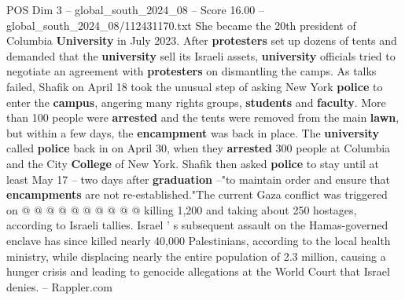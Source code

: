 \begin{textsample}{POS Dim 3 – global\_south\_2024\_08 – Score 16.00 – global\_south\_2024\_08/112431170.txt}
She became the 20th president of Columbia \textbf{University} in July 2023.
After \textbf{protesters} set up dozens of tents and demanded that the \textbf{university} sell its Israeli assets, \textbf{university} officials tried to negotiate an agreement with \textbf{protesters} on dismantling the camps.
As talks failed, Shafik on April 18 took the unusual step of asking New York \textbf{police} to enter the \textbf{campus}, angering many rights groups, \textbf{students} and \textbf{faculty}.
More than 100 people were \textbf{arrested} and the tents were removed from the main \textbf{lawn}, but within a few days, the \textbf{encampment} was back in place.
The \textbf{university} called \textbf{police} back in on April 30, when they \textbf{arrested} 300 people at Columbia and the City \textbf{College} of New York.
Shafik then asked \textbf{police} to stay until at least May 17 -- two days after \textbf{graduation} --"to maintain order and ensure that \textbf{encampments} are not re-established."The current Gaza conflict was triggered on @ @ @ @ @ @ @ @ @ @ killing 1,200 and taking about 250 hostages, according to Israeli tallies.
Israel ' s subsequent assault on the Hamas-governed enclave has since killed nearly 40,000 Palestinians, according to the local health ministry, while displacing nearly the entire population of 2.3 million, causing a hunger crisis and leading to genocide allegations at the World Court that Israel denies. -- Rappler.com

\end{textsample}
